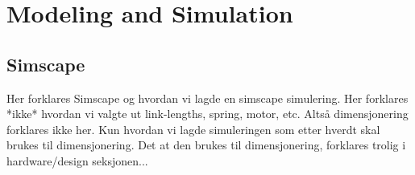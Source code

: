 \section{Modeling and Simulation}

\subsection{Simscape}

Her forklares Simscape og hvordan vi lagde en simscape simulering. Her forklares *ikke* hvordan vi valgte ut link-lengths, spring, motor, etc. Altså dimensjonering forklares ikke her. Kun hvordan vi lagde simuleringen som etter hverdt skal brukes til dimensjonering. Det at den brukes til dimensjonering, forklares trolig i hardware/design seksjonen...
